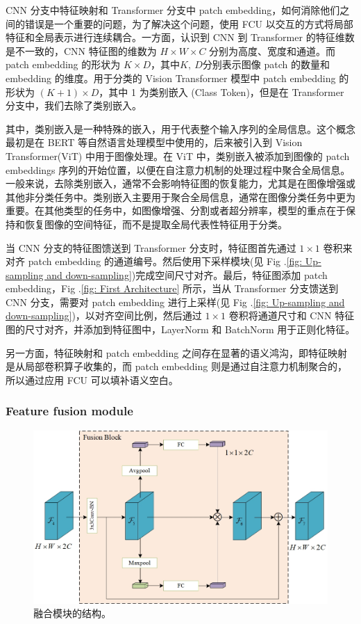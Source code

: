 \documentclass[a4paper]{ctexart}
\begin{document}
	CNN 分支中特征映射和 Transformer 分支中 patch embedding，如何消除他们之间的错误是一个重要的问题，为了解决这个问题，使用 FCU 以交互的方式将局部特征和全局表示进行连续耦合。一方面，认识到 CNN 到 Transformer 的特征维数是不一致的，CNN 特征图的维数为 $H \times W \times C$ 分别为高度、宽度和通道。而 patch embedding 的形状为 $K \times D$，其中$K, \ D$分别表示图像 patch 的数量和 embedding 的维度。用于分类的 Vision Transformer 模型中 patch embedding 的形状为 $\left( K + 1 \right) \times D$，其中 1 为类别嵌入 (Class Token)，但是在 Transformer 分支中，我们去除了类别嵌入。
	
	其中，类别嵌入是一种特殊的嵌入，用于代表整个输入序列的全局信息。这个概念最初是在 BERT 等自然语言处理模型中使用的，后来被引入到 Vision Transformer(ViT) 中用于图像处理。在 ViT 中，类别嵌入被添加到图像的 patch embeddings 序列的开始位置，以便在自注意力机制的处理过程中聚合全局信息。一般来说，去除类别嵌入，通常不会影响特征图的恢复能力，尤其是在图像增强或其他非分类任务中。类别嵌入主要用于聚合全局信息，通常在图像分类任务中更为重要。在其他类型的任务中，如图像增强、分割或者超分辨率，模型的重点在于保持和恢复图像的空间特征，而不是提取全局代表性特征用于分类。
	
	当 CNN 分支的特征图馈送到 Transformer 分支时，特征图首先通过 $1 \times 1$ 卷积来对齐 patch embedding 的通道编号。然后使用下采样模块(见 Fig .\ref{fig: Up-sampling and down-sampling})完成空间尺寸对齐。最后，特征图添加 patch embedding，Fig .\ref{fig: First Architecture} 所示，当从 Transformer 分支馈送到 CNN 分支，需要对 patch embedding 进行上采样(见 Fig .\ref{fig: Up-sampling and down-sampling})，以对齐空间比例，然后通过 $1 \times 1$ 卷积将通道尺寸和 CNN 特征图的尺寸对齐，并添加到特征图中，LayerNorm 和 BatchNorm 用于正则化特征。
	
	另一方面，特征映射和 patch embedding 之间存在显著的语义鸿沟，即特征映射是从局部卷积算子收集的，而 patch embedding 则是通过自注意力机制聚合的，所以通过应用 FCU 可以填补语义空白。
	
	\subsubsection{Feature fusion module}
	
	\begin{figure}[htb]
		\centering 
		\includegraphics[width=0.7\columnwidth]{picture/LLIE/My Architecture/Fusion Block}
		\caption{
			\label{fig: Fusion Block} 
			融合模块的结构。
		}
	\end{figure}
	
\end{document}

